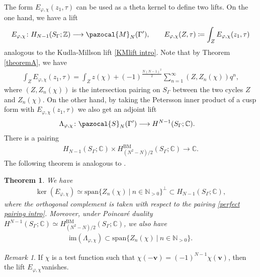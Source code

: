 \documentclass[a4paper,11pt]{amsart} %
\newcommand{\8}{\infty}
\newcommand{\Z}{\mathbb{Z}}
\newcommand{\NN}{\mathbb{N}}
\newcommand{\vbf}{\mathbf{v}}
\newcommand{\Span}{\mathrm{span}}
\newcommand{\BM}{\mathrm{BM}}
\newcommand{\C}{\mathbb{C}}
\newcommand{\Scal}{\pazocal{S}}
\newcommand{\image}{\mathrm{im}}
\newcommand{\Mcal}{\pazocal{M}}
\theoremstyle{mytheoremstyle}
\newtheorem{thm}{Theorem}[section]
\theoremstyle{remark}
\newtheorem{rmk}{Remark}[section]
\numberwithin{equation}{section}
\begin{document}
The form $E_{\varphi, \chi}(z_1,\tau)$ can be used as a theta kernel to define two lifts. On the one hand, we have a lift
\begin{align} \label{lift117}
\quad E_{\varphi, \chi} \colon H_{N-1}(S_\Gamma;\Z)& \longrightarrow \Mcal_N(\Gamma'), \qquad E_{\varphi, \chi}(Z,\tau)\coloneqq \int_Z E_{\varphi, \chi}(z_1,\tau)
\end{align}
analogous to the Kudla-Millson lift \eqref{KMlift intro}. Note that by Theorem \ref{theoremA}, we have
\begin{align}
\int_Z E_{\varphi, \chi}(z_1,\tau)=\int_{Z} z(\chi)+(-1)^{\frac{N(N-1)^2}{2}}\sum_{n=1}^\8 (Z,Z_n(\chi))q^n,
\end{align}
where $(Z,Z_n(\chi))$ is the intersection pairing on $S_\Gamma$ between the two cycles $Z$ and $Z_n(\chi)$.
On the other hand, by taking the Petersson inner product of a cusp form with $E_{\varphi, \chi}(z_1,\tau)$ we also get an adjoint lift
\begin{align}
\Lambda_{\varphi, \chi} \colon \Scal_N(\Gamma') & \longrightarrow H^{N-1}(S_{\Gamma};\C).
\end{align}
There is a pairing
\begin{align} \label{perfect pairing intro}
 H_{N-1}(S_\Gamma;\C) \times H^{\BM}_{(N^2-N)/2}(S_\Gamma;\C) \longrightarrow \C.
\end{align}
The following theorem is analogous to  \cite[Theorem.~4.5]{kmcjm}.
\begin{thm} \label{theoremC} We have
\begin{align}
\ker(E_{\varphi, \chi}) \simeq \Span \{Z_n(\chi) \ \vert \ n \in \NN_{>0} \}^\perp \subset H_{N-1}(S_\Gamma;\C),
\end{align}
where the orthogonal complement is taken with respect to the pairing \eqref{perfect pairing intro}. Moreover, under Poincaré duality $H^{N-1}(S_\Gamma;\C) \simeq H^{\BM}_{(N^2-N)/2}(S_\Gamma;\C)$, we also have
\begin{align}
\image(\Lambda_{\varphi, \chi}) \subset \Span \{Z_n(\chi) \ \vert \ n \in \NN_{>0} \}.
\end{align}
\end{thm}
 \begin{rmk} If $\chi$ is a test function such that $\chi(-\vbf)=(-1)^{N-1}\chi(\vbf)$, then the lift $E_{\varphi, \chi}$vanishes.
 \end{rmk}
\end{document}
